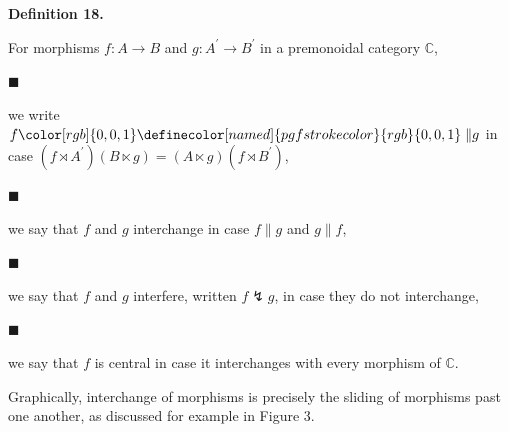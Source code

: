 \documentclass[10pt,a4paper]{article}
\begin{document}
 
 
\par\medskip\noindent\textbf{Definition 18.}\par
 
 
For morphisms $f:A\to B$ and $g:A^{\prime}\to B^{\prime}$ in a premonoidal category $\mathbb{C}$,\par
  
\par\noindent  $\blacksquare$ 
 
we write $f{\color[rgb]{0,0,1}\definecolor[named]{pgfstrokecolor}{rgb}{0,0,1}\parallel}g$ in case $(f\rtimes A^{\prime})(B\ltimes g)=(A\ltimes g)(f\rtimes B^{\prime})$,\par
 
 
 
\par\noindent  $\blacksquare$ 
 
we say that $f$ and $g$ interchange in case $f\parallel g$ and $g\parallel f$,\par
 
 
 
\par\noindent  $\blacksquare$ 
 
we say that $f$ and $g$ interfere, written $f\lightning g$, in case they do not interchange,\par
 
 
 
\par\noindent  $\blacksquare$ 
 
we say that $f$ is central in case it interchanges with every morphism of $\mathbb{C}$.\par
 
 
  
 
 
 
Graphically, interchange of morphisms is precisely the sliding of morphisms past one another, as discussed for example in Figure 3.\par
 
 
 
\end{document}
